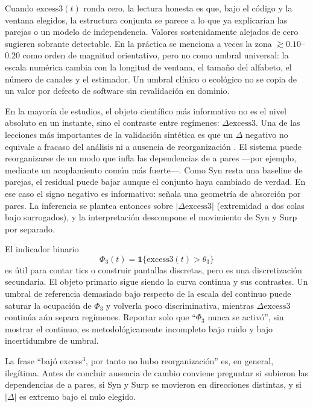 \documentclass[11pt,a4paper]{article}
\begin{document}
Cuando $\mathrm{excess3}(t)$ ronda cero, la lectura honesta es que, bajo el
c\'odigo y la ventana elegidos, la estructura conjunta se parece a lo que ya
explicar\'ian las parejas o un modelo de independencia. Valores
sostenidamente alejados de cero sugieren sobrante detectable. En la
pr\'actica se menciona a veces la zona $\gtrsim 0.10$--$0.20$ como orden de
magnitud orientativo, pero no como umbral universal: la escala num\'erica
cambia con la longitud de ventana, el tama\~no del alfabeto, el n\'umero de
canales y el estimador. Un umbral cl\'inico o ecol\'ogico no se copia de un
valor por defecto de software sin revalidaci\'on en dominio.

En la mayor\'ia de estudios, el objeto cient\'ifico m\'as informativo no es el
nivel absoluto en un instante, sino el contraste entre reg\'imenes:
$\Delta\mathrm{excess3}$. Una de las lecciones m\'as importantes de la
validaci\'on sint\'etica es que un $\Delta$ negativo no equivale a fracaso
del an\'alisis ni a ausencia de reorganizaci\'on \citep{Padilla2026excess3}.
El sistema puede reorganizarse de un modo que infla las dependencias de a
pares ---por ejemplo, mediante un acoplamiento com\'un m\'as fuerte---. Como
$\mathrm{Syn}$ resta una baseline de parejas, el residual puede bajar
aunque el conjunto haya cambiado de verdad. En ese caso el signo negativo
es informativo: se\~nala una geometr\'ia de absorci\'on por pares. La
inferencia se plantea entonces sobre $|\Delta\mathrm{excess3}|$ (extremidad
a dos colas bajo surrogados), y la interpretaci\'on descompone el movimiento
de Syn y Surp por separado.

El indicador binario
\begin{equation}
\Phi_3(t)=\mathbf{1}\{\mathrm{excess3}(t)>\theta_3\}
\end{equation}
es \'util para contar tics o construir pantallas discretas, pero es una
discretizaci\'on secundaria. El objeto primario sigue siendo la curva
continua y sus contrastes. Un umbral de referencia demasiado bajo respecto
de la escala del continuo puede saturar la ocupaci\'on de $\Phi_3$ y volverla
poco discriminativa, mientras $\Delta\mathrm{excess3}$ contin\'ua a\'un
separa reg\'imenes. Reportar solo que ``$\Phi_3$ nunca se activ\'o'', sin
mostrar el continuo, es metodol\'ogicamente incompleto bajo ruido y bajo
incertidumbre de umbral.

\begin{atencion}
La frase ``baj\'o excess$^3$, por tanto no hubo reorganizaci\'on'' es, en
general, ileg\'itima. Antes de concluir ausencia de cambio conviene
preguntar si subieron las dependencias de a pares, si Syn y Surp se
movieron en direcciones distintas, y si $|\Delta|$ es extremo bajo el nulo
elegido.
\end{atencion}
\end{document}
